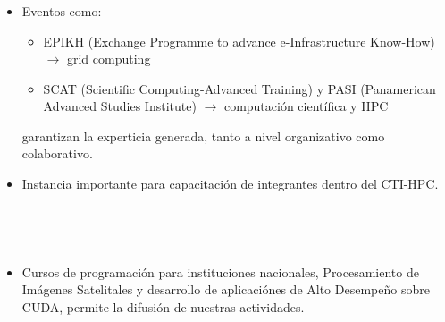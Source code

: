 \frame
{
\frametitle{}


\begin{columns}
\begin{itemize}
\item Eventos como:
\begin{itemize} 
\item  EPIKH (Exchange Programme to advance e-Infrastructure Know-How) $\rightarrow$ grid computing
\item SCAT (Scientific Computing-Advanced Training) y PASI (Panamerican Advanced Studies Institute) $\rightarrow$ computaci\'{o}n cient\'{i}fica y HPC
\end{itemize} 
garantizan 
la experticia generada, tanto a nivel organizativo como colaborativo. 
\item Instancia importante para capacitación de integrantes dentro del CTI-HPC. 
\end{itemize}
\end{columns}
}

\frame
{
\frametitle{}

\begin{columns}
\begin{itemize}
\item Cursos de programación para instituciones nacionales, Procesamiento de Imágenes Satelitales y desarrollo de aplicaciónes de Alto Desempeño sobre CUDA, permite la difusión de nuestras actividades.
\end{itemize}
\end{columns}

}


